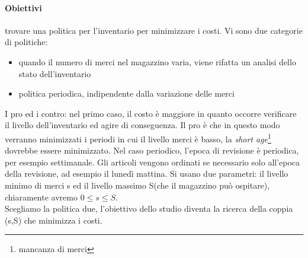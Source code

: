 \documentclass{article}
\begin{document}
\paragraph{Obiettivi}trovare una politica per l'inventario per minimizzare i costi. Vi sono due categorie di politiche:
\begin{itemize}
\item quando il numero di merci nel magazzino varia, viene rifatta un analisi dello stato dell'inventario
\item politica periodica, indipendente dalla variazione delle merci
\end{itemize}
I pro ed i contro: nel primo caso, il costo è maggiore in quanto occorre verificare il livello dell'inventario ed agire di conseguenza. Il pro è che in questo modo verranno minimizzati i periodi in cui il livello merci è basso, la \textit{short age}\footnote{mancanza di merci} dovrebbe essere  minimizzato. Nel caso periodico, l'epoca di revisione è periodica, per esempio settimanale. Gli articoli vengono ordinati se necessario solo all'epoca della revisione, ad esempio il lunedì mattina. Si usano due parametri: il livello minimo di merci s ed il livello massimo S(che il magazzino può ospitare), chiaramente avremo $0 \leq s \leq S$.\\ Scegliamo la politica due, l'obiettivo dello studio diventa la ricerca della coppia (s,S) che minimizza i costi.
\end{document}
